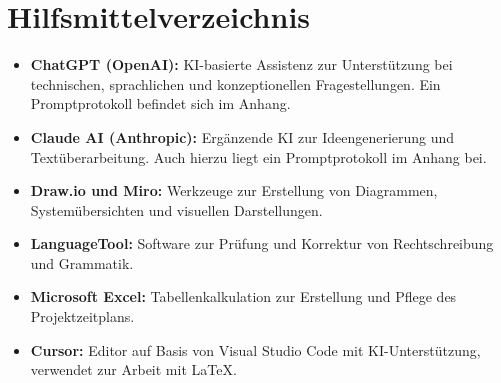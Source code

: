 
\chapter*{Hilfsmittelverzeichnis}
\vspace{-5em}
\begin{itemize}
    \item \textbf{ChatGPT (OpenAI):} KI-basierte Assistenz zur Unterstützung bei technischen, sprachlichen und konzeptionellen Fragestellungen. Ein Promptprotokoll befindet sich im Anhang.
    \item \textbf{Claude AI (Anthropic):} Ergänzende KI zur Ideengenerierung und Textüberarbeitung. Auch hierzu liegt ein Promptprotokoll im Anhang bei.
    \item \textbf{Draw.io und Miro:} Werkzeuge zur Erstellung von Diagrammen, Systemübersichten und visuellen Darstellungen.
    \item \textbf{LanguageTool:} Software zur Prüfung und Korrektur von Rechtschreibung und Grammatik.
    \item \textbf{Microsoft Excel:} Tabellenkalkulation zur Erstellung und Pflege des Projektzeitplans.
    \item \textbf{Cursor:} Editor auf Basis von Visual Studio Code mit KI-Unterstützung, verwendet zur Arbeit mit \LaTeX{}.
\end{itemize} 